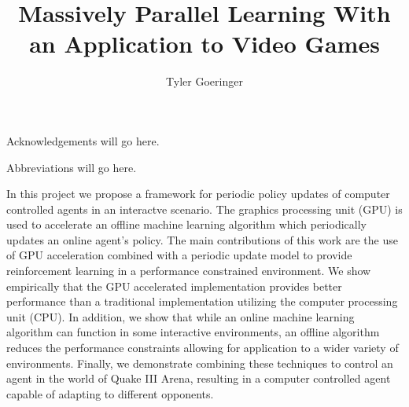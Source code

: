\clearpage{}

\title{Massively Parallel Learning With an Application to Video Games}
\author{Tyler Goeringer}
\date{}
\maketitle


\committeeapprovalpage

\begin{acknowledgments}
    Acknowledgements will go here.
\end{acknowledgments}

\tableofcontents
\listoftables
\listoffigures

\begin{abbreviations}
    Abbreviations will go here.
\end{abbreviations}

\begin{umiabstract}
    In this project we propose a framework for periodic policy updates of computer controlled agents in an interactve scenario. The graphics processing unit (GPU) is used to accelerate an offline machine learning algorithm which periodically updates an online agent's policy. The main contributions of this work are the use of GPU acceleration combined with a periodic update model to provide reinforcement learning in a performance constrained environment. We show empirically that the GPU accelerated implementation provides better performance than a traditional implementation utilizing the computer processing unit (CPU). In addition, we show that while an online machine learning algorithm can function in some interactive environments, an offline algorithm reduces the performance constraints allowing for application to a wider variety of environments. Finally, we demonstrate combining these techniques to control an agent in the world of Quake III Arena, resulting in a computer controlled agent capable of adapting to different opponents.
\end{umiabstract}

\clearpage{}